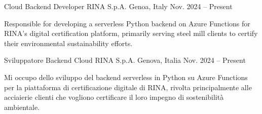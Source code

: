


\begin{cventries}


\ifenglish
\cventry
{Cloud Backend Developer} %
{RINA S.p.A.} %
{Genoa, Italy} %
{Nov. 2024 -- Present} %
{ %
\begin{cvitems}
  \item {Responsible for developing a serverless Python backend on Azure Functions for RINA's digital certification platform, primarily serving steel mill clients to certify their environmental sustainability efforts.}
\end{cvitems}
}
\else
\cventry
{Sviluppatore Backend Cloud} %
{RINA S.p.A.} %
{Genova, Italia} %
{Nov. 2024 -- Present} %
{ %
\begin{cvitems}
  \item {Mi occupo dello sviluppo del backend serverless in Python su Azure Functions per la piattaforma di certificazione digitale di RINA, rivolta principalmente alle acciaierie clienti che vogliono certificare il loro impegno di sostenibilità ambientale.}
\end{cvitems}
}
\fi



\end{cventries}
